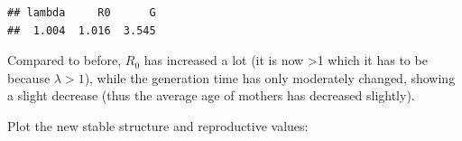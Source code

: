 \documentclass[
]{book}
\newenvironment{Shaded}{\begin{snugshade}}{\end{snugshade}}
\newcommand{\CommentTok}[1]{\textcolor[rgb]{0.56,0.35,0.01}{\textit{#1}}}
\newcommand{\DecValTok}[1]{\textcolor[rgb]{0.00,0.00,0.81}{#1}}
\newcommand{\FunctionTok}[1]{\textcolor[rgb]{0.00,0.00,0.00}{#1}}
\newcommand{\NormalTok}[1]{#1}
\newcommand{\OtherTok}[1]{\textcolor[rgb]{0.56,0.35,0.01}{#1}}
\newcommand{\SpecialCharTok}[1]{\textcolor[rgb]{0.00,0.00,0.00}{#1}}
\newcommand{\StringTok}[1]{\textcolor[rgb]{0.31,0.60,0.02}{#1}}
\begin{document}
\begin{Shaded}
\end{Shaded}

\begin{verbatim}
## lambda     R0      G 
##  1.004  1.016  3.545
\end{verbatim}

Compared to before, \(R_0\) has increased a lot (it is now \textgreater1 which it has to be because \(\lambda>1\)), while the generation time has only moderately changed, showing a slight decrease (thus the average age of mothers has decreased slightly).

Plot the new stable structure and reproductive values:
\end{document}
